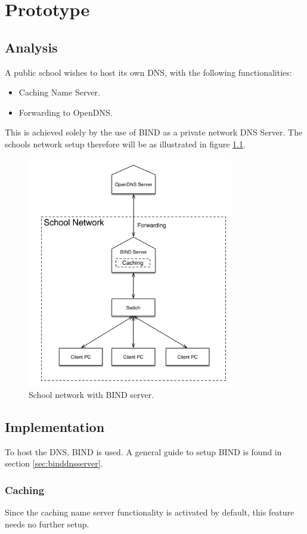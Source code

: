 \chapter{Prototype}
\section{Analysis}
A public school wishes to host its own DNS, with the following functionalities:
\begin{itemize}
\item Caching Name Server.
\item Forwarding to OpenDNS.
\end{itemize}

This is achieved solely by the use of BIND as a private network DNS Server. The schools network setup therefore will be as illustrated in figure \ref{prototype_network_diagram}.

\begin{figure}[ht!]
\centering
\includegraphics[width=90mm]{img/prototype_network_diagram.png}
\caption{School network with BIND server.}
\label{prototype_network_diagram}
\end{figure}

\section{Implementation}
To host the DNS, BIND is used. A general guide to setup BIND is found in section \ref{sec:binddnsserver}.

\subsection{Caching}
Since the caching name server functionality is activated by default, this feature needs no further setup.

